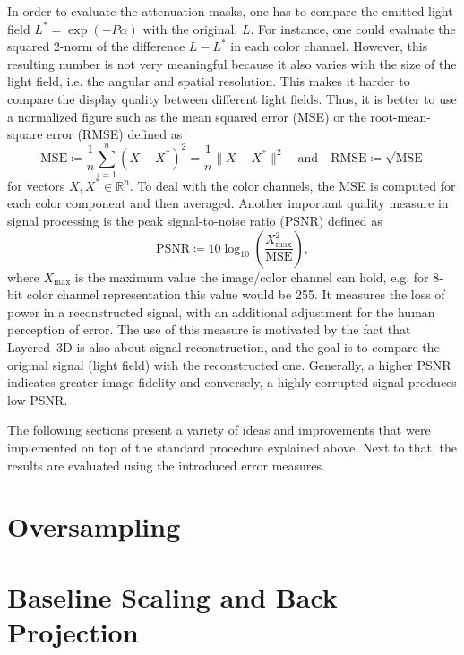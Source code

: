 In order to evaluate the attenuation masks, one has to compare the emitted light field $L^\ast = \exp(- P \alpha)$ with the original, $L$.
For instance, one could evaluate the squared 2-norm of the difference $L - L^\ast$ in each color channel.
However, this resulting number is not very meaningful because it also varies with the size of the light field, i.e. the angular and spatial resolution.
This makes it harder to compare the display quality between different light fields.
Thus, it is better to use a normalized figure such as the mean squared error \mbox{(MSE)} or the root-mean-square error \mbox{(RMSE)} defined as
\begin{equation*}
	\text{MSE} \coloneqq \frac{1}{n} \sum_{i = 1}^{n} (X - X^\ast)^2 = \frac{1}{n} \lVert X - X^\ast \rVert^2
	\quad \text{and} \quad
	\text{RMSE} \coloneqq \sqrt{\text{MSE}}
\end{equation*}
for vectors $X, X^\ast \in \mathbb{R}^n$.
To deal with the color channels, the \mbox{MSE} is computed for each color component and then averaged.
Another important quality measure in signal processing is the peak signal-to-noise ratio \mbox{(PSNR)} defined as
\begin{equation*}
	\text{PSNR} \coloneqq 10 \log_{10} \left(\frac{X_\text{max}^2}{\text{MSE}}\right),
\end{equation*}
where $X_\text{max}$ is the maximum value the image/color channel can hold, e.g. for 8-bit color channel representation this value would be 255.
It measures the loss of power in a reconstructed signal, with an additional adjustment for the human perception of error.
The use of this measure is motivated by the fact that \mbox{Layered 3D} is also about signal reconstruction, and the goal is to compare the original signal (light field) with the reconstructed one. 
Generally, a higher \mbox{PSNR} indicates greater image fidelity and conversely, a highly corrupted signal produces low \mbox{PSNR}.

The following sections present a variety of ideas and improvements that were implemented on top of the standard procedure explained above.
Next to that, the results are evaluated using the introduced error measures.

\section{Oversampling}
\label{sec:oversampling}

\section{Baseline Scaling and Back Projection}
\label{sec:baseline_scaling}

